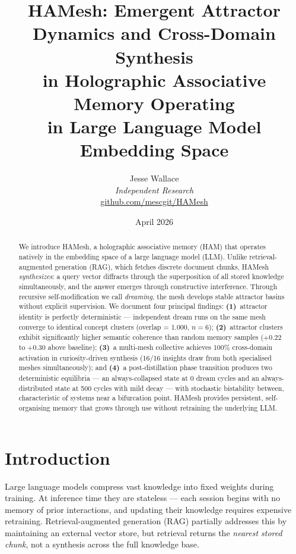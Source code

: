 \documentclass[11pt]{article}
\title{HAMesh: Emergent Attractor Dynamics and Cross-Domain Synthesis\\
in Holographic Associative Memory Operating\\
in Large Language Model Embedding Space}
\author{Jesse Wallace\\
\textit{Independent Research}\\
\href{https://github.com/mescgit/HAMesh}{github.com/mescgit/HAMesh}}
\date{April 2026}
\begin{document}
\maketitle

\begin{abstract}
We introduce HAMesh, a holographic associative memory (HAM) that operates
natively in the embedding space of a large language model (LLM). Unlike
retrieval-augmented generation (RAG), which fetches discrete document chunks,
HAMesh \emph{synthesizes}: a query vector diffracts through the superposition
of all stored knowledge simultaneously, and the answer emerges through
constructive interference. Through recursive self-modification we call
\emph{dreaming}, the mesh develops stable attractor basins without explicit
supervision. We document four principal findings: \textbf{(1)}~attractor
identity is perfectly deterministic --- independent dream runs on the same
mesh converge to identical concept clusters (overlap = 1.000, $n=6$);
\textbf{(2)}~attractor clusters exhibit significantly higher semantic
coherence than random memory samples ($+0.22$ to $+0.30$ above baseline);
\textbf{(3)}~a multi-mesh collective achieves 100\% cross-domain activation in
curiosity-driven synthesis (16/16 insights draw from both specialised meshes
simultaneously); and \textbf{(4)}~a post-distillation phase transition
produces two deterministic equilibria --- an always-collapsed state at 0 dream
cycles and an always-distributed state at 500 cycles with mild decay --- with
stochastic bistability between, characteristic of systems near a bifurcation
point. HAMesh provides persistent, self-organising memory that grows through
use without retraining the underlying LLM.
\end{abstract}

\section{Introduction}

Large language models compress vast knowledge into fixed weights during
training. At inference time they are stateless --- each session begins with
no memory of prior interactions, and updating their knowledge requires
expensive retraining. Retrieval-augmented generation (RAG) partially addresses
this by maintaining an external vector store, but retrieval returns the
\emph{nearest stored chunk}, not a synthesis across the full knowledge base.
\end{document}
